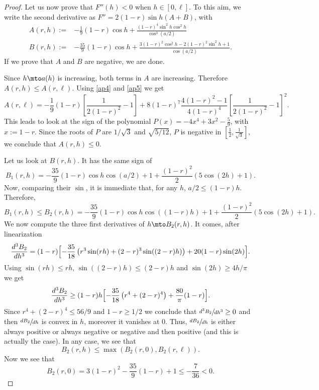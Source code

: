 \begin{proof}
Let us now prove that $F''(h)<0$ when $h\in [0,\ell]$. To this aim, we write the second derivative as $F''=2(1-r)\sin h (A+B)$, with
\begin{align*}
A(r,h):=& -\frac{1}{9} (1-r) \cos h + \frac{(1-r)^4\sin^2 h \cos^2 h}{\cos^3(a/2)}
\\
B(r,h):=& -\frac{35}{9} (1-r)\cos h + \frac{3(1-r)^2\cos^2 h - 2 (1-r)^2\sin^2 h + 1}{\cos(a/2)}.
\end{align*}
If we prove that $A$ and $B$ are negative, we are done.

Since $h\mto a(h)$ is increasing, both terms in $A$ are increasing. Therefore
$A(r,h)\leq A(r,\ell)$. Using \eqref{ap4} and \eqref{ap5} we get
\[
A(r,\ell)=-\frac{1}{9}(1-r)\left[\frac{1}{2(1-r)^2}-1\right]+8(1-r)^7
\frac{4(1-r)^2-1}{4(1-r)^4}
\left[\frac{1}{2(1-r)^2}-1\right]^2.
\]
This leads to look at the sign of
the polynomial $P(x)=-4x^4+3x^2-\frac{5}{9}$, with $x:=1-r$. Since the roots of $P$
are $1/\sqrt{3}$ and $\sqrt{5/12}$, $P$ is negative in $[\frac{1}{2},\frac{1}{\sqrt{3}}]$, we conclude that $A(r,h)\leq 0$.

Let us look at $B(r,h)$. It has the same sign of\vspace*{-3pt}
\[
B_1(r,h)=-\frac{35}{9} (1-r)\cos h \cos(a/2) + 1 +\frac{(1-r)^2}{2}(5\cos(2h) +1).
\]
Now, comparing their $\sin$, it is immediate that, for any $h$, $a/2\leq (1-r)h$.
Therefore,
\[
B_1(r,h)\leq B_2(r,h)= -\frac{35}{9} (1-r)\cos h \cos((1-r)h) + 1 +\frac{(1-r)^2}{2}(5\cos(2h) +1).
\]
We now compute the three first derivatives of $h\mto B_2(r,h)$. It comes, after
linearization\vspace*{-3pt}
\[
\frac{d^3 B_2}{dh^3}=(1-r)\Bigl[-\frac{35}{18}\left(r^3\sin(rh)+(2-r)^3\sin((2-r)h)\right)
+20(1-r)\sin(2h)\Bigr].
\]
Using $\sin(rh)\leq rh$, $\sin((2-r)h)\leq (2-r)h$ and $\sin(2h)\geq 4h/\pi$
we get
\[
\frac{d^3 B_2}{d h^3}\geq (1-r)h\Bigl[-\frac{35}{18}\left(r^4+(2-r)^4\right)
+\frac{80}{\pi}(1-r)\Bigr].
\]
Since $r^4+(2-r)^4\leq 56/9$ and $1-r\geq 1/2$ we conclude that
$\sfrac{d^3 B_2}{dh^3} \geq 0$ and then $\sfrac{d B_2}{dh}$ is convex in $h$,
moreover it vanishes at $0$. Thus, $\sfrac{d B_2}{dh}$ is either always positive or always
negative or negative and then positive (and this is actually the case).
In any case, we see that\vspace*{-3pt}
\[
B_2(r,h)\leq \max\left(B_2(r,0),B_2(r,\ell)\right).
\]
Now we see that\vspace*{-3pt}
\[
B_2(r,0)=3(1-r)^2-\frac{35}{9}(1-r)+1 \leq -\frac{7}{36} <0.
\]


\end{proof}
